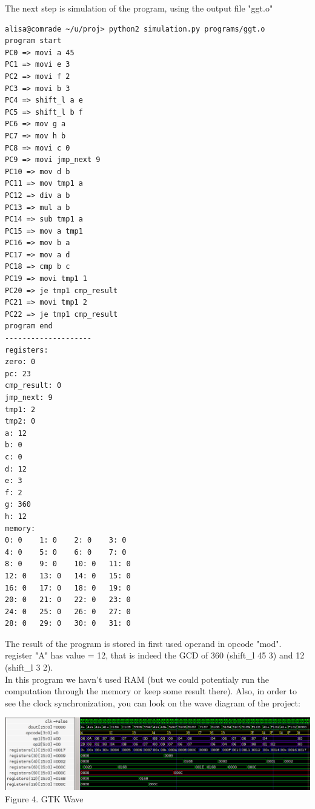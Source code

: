 \documentclass[11pt,a4paper]{article}
\begin{document}
The next step is simulation of the program, using the output file "ggt.o"
\begin{verbatim}
alisa@comrade ~/u/proj> python2 simulation.py programs/ggt.o
program start
PC0 => movi a 45
PC1 => movi e 3
PC2 => movi f 2
PC3 => movi b 3
PC4 => shift_l a e
PC5 => shift_l b f
PC6 => mov g a
PC7 => mov h b
PC8 => movi c 0
PC9 => movi jmp_next 9
PC10 => mov d b
PC11 => mov tmp1 a
PC12 => div a b
PC13 => mul a b
PC14 => sub tmp1 a
PC15 => mov a tmp1
PC16 => mov b a
PC17 => mov a d
PC18 => cmp b c
PC19 => movi tmp1 1
PC20 => je tmp1 cmp_result
PC21 => movi tmp1 2
PC22 => je tmp1 cmp_result
program end
--------------------
registers:
zero: 0
pc: 23
cmp_result: 0
jmp_next: 9
tmp1: 2
tmp2: 0
a: 12
b: 0
c: 0
d: 12
e: 3
f: 2
g: 360
h: 12
memory:
0: 0    1: 0    2: 0    3: 0
4: 0    5: 0    6: 0    7: 0
8: 0    9: 0    10: 0   11: 0
12: 0   13: 0   14: 0   15: 0
16: 0   17: 0   18: 0   19: 0
20: 0   21: 0   22: 0   23: 0
24: 0   25: 0   26: 0   27: 0
28: 0   29: 0   30: 0   31: 0
\end{verbatim}
The result of the program is stored in first used operand in opcode "mod". register "A" has value = 12, that is indeed the GCD of 360 (shift\_l 45 3) and 12 (shift\_l 3 2).\\
In this program we havn't used RAM (but we could potentialy run the computation through the memory or keep some result there).
Also, in order to see the clock synchronization, you can look on the wave diagram of the project:\\
\begin{center}
\includegraphics[scale=0.5]{pics/gtkwave.png}\\
Figure 4. GTK Wave
\end{center}			
			
\newpage
\end{document}
